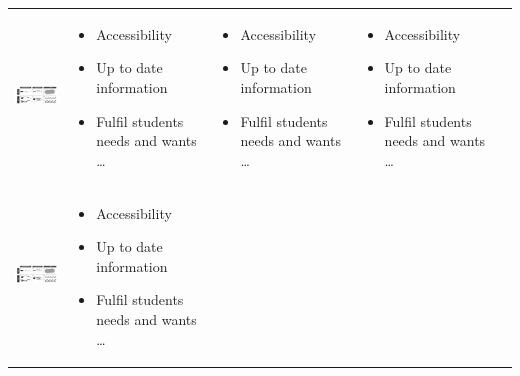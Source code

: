 \documentclass{article}
\begin{document}
\begin{table}[htb]
\begin{tabular}{  c | m{3cm} | m{3cm} | m{3cm} | m{1cm} }
 \begin{minipage}{.3\textwidth}
      \includegraphics[width=\linewidth, height=20mm]{cilia}
    \end{minipage}
    &
     \begin{itemize}
        \item Accessibility
        \item Up to date information
        \item Fulfil students needs and wants \ldots
      \end{itemize}
    
    & 

      \begin{itemize}
        \item Accessibility
        \item Up to date information
        \item Fulfil students needs and wants \ldots
      \end{itemize}
    &

	 \begin{itemize}
        \item Accessibility
        \item Up to date information
        \item Fulfil students needs and wants \ldots
      \end{itemize} \\

 \begin{minipage}{.3\textwidth}
      \includegraphics[width=\linewidth, height=20mm]{cilia}
    \end{minipage}
    &
     \begin{itemize}
        \item Accessibility
        \item Up to date information
        \item Fulfil students needs and wants \ldots
      \end{itemize}
    

\end{tabular}
\end{table}
\end{document}
